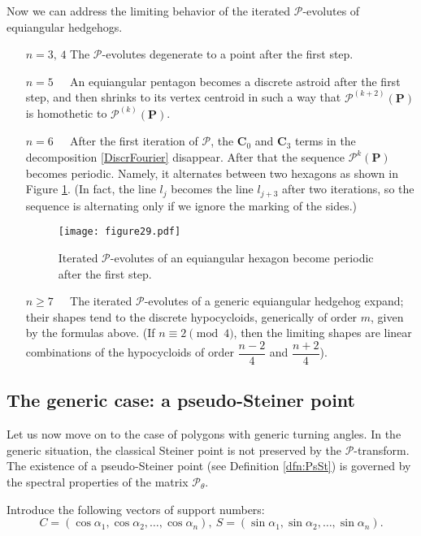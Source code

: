 \documentclass[12pt]{article}
\newcommand{\Pev}{\mathcal{P}}
\renewcommand{\P}{\mathbf{P}}
\begin{document}
Now we can address the limiting behavior of the  iterated $\Pev$-evolutes of equiangular hedgehogs.
\begin{enumerate}
\item [$n=3,\,4$] The $\Pev$-evolutes degenerate to a point after the first step.
\item[$n=5\phantom{,\,4}$] An equiangular pentagon becomes a discrete astroid after the first step, and then shrinks to its vertex centroid in such a way that $\Pev^{(k+2)}(\P)$ is homothetic to  $\Pev^{(k)}(\P)$.
\item[$n=6\phantom{,\,4}$]   After the first iteration of $\Pev$, the  $\mathbf{C}_0$ and $\mathbf{C}_3$ terms in the decomposition \eqref{DiscrFourier} disappear. After that the sequence $\Pev^k(\P)$ becomes periodic. Namely, it alternates between two hexagons as shown in Figure \ref{RegHexEvol}. (In fact, the line $l_j$ becomes the line $l_{j+3}$ after two iterations, so the sequence is alternating only if we ignore the marking of the sides.)

 \begin{figure}[htbp]
 \centering
 \texttt{[image: figure29.pdf]}
 \caption{Iterated $\Pev$-evolutes of an equiangular hexagon become periodic after the first step.}
 \label{RegHexEvol}
 \end{figure}
 
 \item[$n\ge 7\phantom{,\,4}$]	The iterated $\Pev$-evolutes of a generic equiangular  hedgehog expand; their shapes tend to the discrete hypocycloids, generically of  order $m$, given by the formulas above. \big(If $n \equiv 2\pmod 4$, then the limiting shapes are linear combinations of the hypocycloids of order $\dfrac{n-2}4$ and $\dfrac{n+2}4$\big).
 
\end{enumerate}  

\subsection{The generic case: a pseudo-Steiner point}
\label{sec:PsSt}
Let us now move on to the case of polygons with generic turning angles. In the generic situation, the classical Steiner point is not preserved by the $\Pev$-transform. The existence of a pseudo-Steiner point (see Definition \ref{dfn:PsSt}) is governed by the spectral properties of the matrix $\Pev_\theta$.

Introduce the following vectors of support numbers:
\[ C=(\cos\alpha_1,\cos\alpha_2,\ldots,\cos\alpha_n),\ S=(\sin\alpha_1,\sin\alpha_2,\ldots,\sin\alpha_n). \]
\end{document}
